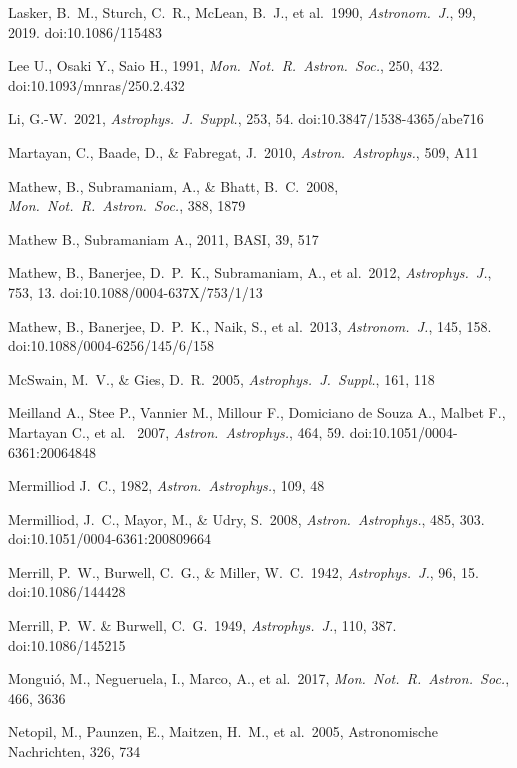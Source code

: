 \documentclass{jaa}
\def\apjs{{\it Astrophys.~J.~Suppl.}}
\def\apj{{\it Astrophys.~J.}}
\def\aj{{\it Astronom.~J.}}
\def\mnras{{\it Mon.~Not.~R.~Astron.~Soc.}}
\def\aap{{\it Astron.~Astrophys.}}
\begin{document}
\begin{thebibliography}{99}
 Lasker, B.~M., Sturch, C.~R., McLean, B.~J., et al.\ 1990, \aj, 99, 2019. doi:10.1086/115483

 Lee U., Osaki Y., Saio H., 1991, \mnras, 250, 432. doi:10.1093/mnras/250.2.432

 Li, G.-W.\ 2021, \apjs, 253, 54. doi:10.3847/1538-4365/abe716

 Martayan, C., Baade, D., \& Fabregat, J.\ 2010, \aap, 509, A11 

 Mathew, B., Subramaniam, A., \& Bhatt, B.~C.\ 2008, \mnras, 388, 1879

 Mathew B., Subramaniam A., 2011, BASI, 39, 517

 Mathew, B., Banerjee, D.~P.~K., Subramaniam, A., et al.\ 2012, \apj, 753, 13. doi:10.1088/0004-637X/753/1/13

 Mathew, B., Banerjee, D.~P.~K., Naik, S., et al.\ 2013, \aj, 145, 158. doi:10.1088/0004-6256/145/6/158

 McSwain, M.~V., \& Gies, D.~R.\ 2005, \apjs, 161, 118

 Meilland A., Stee P., Vannier M., Millour F., Domiciano de Souza A., Malbet F., Martayan C., et al. \ 2007, \aap, 464, 59. doi:10.1051/0004-6361:20064848

 Mermilliod J.~C., 1982, \aap, 109, 48

 Mermilliod, J.~C., Mayor, M., \& Udry, S.\ 2008, \aap, 485, 303. doi:10.1051/0004-6361:200809664

 Merrill, P.~W., Burwell, C.~G., \& Miller, W.~C.\ 1942, \apj, 96, 15. doi:10.1086/144428

 Merrill, P.~W. \& Burwell, C.~G.\ 1949, \apj, 110, 387. doi:10.1086/145215

 Mongui{\'o}, M., Negueruela, I., Marco, A., et al.\ 2017, \mnras, 466, 3636 

 Netopil, M., Paunzen, E., Maitzen, H.~M., et al.\ 2005, Astronomische Nachrichten, 326, 734 


\end{thebibliography}
\end{document}
